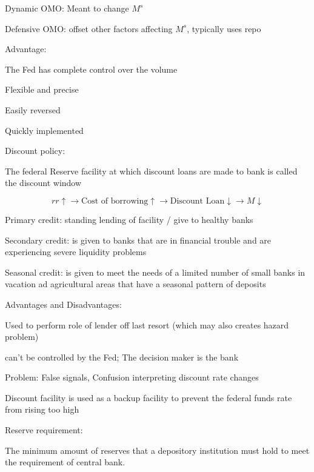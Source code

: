 \documentclass[10pt, a4paper]{article}
\begin{document}
        \medskip

        Dynamic OMO: Meant to change $M^s$

        Defensive OMO: offset other factors affecting $M^s$, typically uses repo
        
        Advantage:

        \quad The Fed has complete control over the volume

        \quad Flexible and precise 

        \quad Easily reversed 

        \quad Quickly implemented 

        \medskip 
        \medskip
        \medskip
    
        Discount  policy: 

        The federal Reserve facility at which discount loans are made to bank is called the discount window 

        $$rr\uparrow \rightarrow \text{Cost of borrowing} \uparrow \rightarrow \text{Discount Loan}\downarrow \rightarrow M \downarrow$$

        Primary credit: standing lending of facility / give to healthy banks 

        Secondary credit: is given to banks that are in financial trouble and are experiencing severe liquidity problems  

        Seasonal credit: is given to meet the needs of a limited number of small banks in vacation ad agricultural areas that have a seasonal pattern of deposits  

        \medskip

        Advantages and Disadvantages: 

        \quad Used to perform role  of lender off last resort (which may also creates hazard problem) 

        \quad can't be controlled by the Fed; The decision maker is the bank 

        \quad Problem: False signals, Confusion interpreting discount rate changes

        \quad Discount facility is used as a backup facility to prevent the federal funds rate  from rising too high

        \medskip 
        \medskip
        \medskip    
        
        Reserve requirement: 

        The minimum amount of reserves that a depository institution must hold to meet the requirement of central bank.
\end{document}
